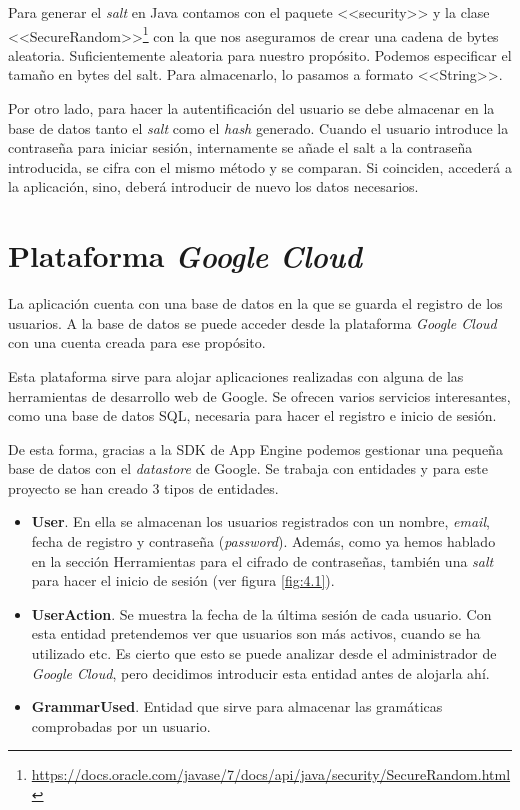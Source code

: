 Para generar el \emph{salt} en Java contamos con el paquete <<security>> y la clase <<SecureRandom>>\footnote{\url{https://docs.oracle.com/javase/7/docs/api/java/security/SecureRandom.html}} con la que nos aseguramos de crear una cadena de bytes aleatoria. Suficientemente aleatoria para nuestro propósito. Podemos especificar el tamaño en bytes del salt. Para almacenarlo, lo pasamos a formato <<String>>. 


Por otro lado, para hacer la autentificación del usuario se debe almacenar en la base de datos tanto el \emph{salt} como el \emph{hash} generado. Cuando el usuario introduce la contraseña para iniciar sesión, internamente se añade el salt a la contraseña introducida, se cifra con el mismo método y se comparan. Si coinciden, accederá a la aplicación, sino, deberá introducir de nuevo los datos necesarios.



\section{Plataforma \emph{Google Cloud}}


La aplicación cuenta con una base de datos en la que se guarda el registro de los usuarios. A la base de datos se puede acceder desde la plataforma \emph{Google Cloud} con una cuenta creada para ese propósito.

Esta plataforma sirve para alojar aplicaciones realizadas con alguna de las  herramientas de desarrollo web de Google. Se ofrecen varios servicios interesantes, como una base de datos SQL, necesaria para hacer el registro e inicio de sesión.

De esta forma, gracias a la SDK de App Engine podemos gestionar una pequeña base de datos con el \emph{datastore} de Google. Se trabaja con entidades y para este proyecto se han creado 3 tipos de entidades.

\begin{itemize}
\item \textbf{User}. En ella se almacenan los usuarios registrados con un nombre, \emph{email}, fecha de registro y contraseña (\emph{password}). Además, como ya hemos hablado en la sección Herramientas para el cifrado de contraseñas, también una \emph{salt} para hacer el inicio de sesión (ver figura \ref{fig:4.1}).
\item \textbf{UserAction}. Se muestra la fecha de la última sesión de cada usuario. Con esta entidad pretendemos ver que usuarios son más activos, cuando se ha utilizado etc. Es cierto que esto se puede analizar desde el administrador de \emph{Google Cloud}, pero decidimos introducir esta entidad antes de alojarla ahí.
\item \textbf{GrammarUsed}. Entidad que sirve para almacenar las gramáticas comprobadas por un usuario. 
\end{itemize}

